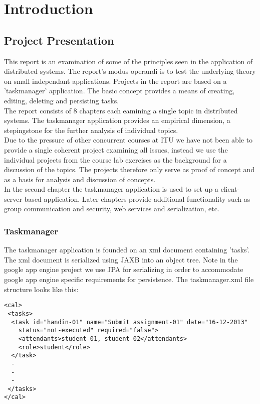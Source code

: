 \chapter{Introduction}
\minitoc

\section{Project Presentation}

This report is an examination of some of the principles seen in the application of distributed systems. The report's modus operandi is to test the underlying theory on small independant applications. Projects in the report are based on a 'taskmanager' application. The basic concept provides a means of creating, editing, deleting and persisting tasks. \\

The report consists of 8 chapters each eamining a single topic in distributed systems. The taskmanager application provides an empirical dimension, a stepingstone for the further analysis of individual topics. \\

Due to the pressure of other concurrent courses at ITU we have not been able to provide a single coherent project examining all issues, instead we use the individual projects from the course lab exercises as the background for a discussion of the topics. The projects therefore only serve as proof of concept and as a basis for analysis and discussion of concepts.  \\

In the second chapter the taskmanager application is used to set up a client-server based application. Later chapters provide additional functionality such as group communication and security, web services and serialization, etc. \\

\begin{comment}
The idea is to try out some of the techniques commonly seen in the implementation of distributed systems and thereby demonstrate our understanding of the theories behind, as well as (some of), the challenges faced by distributed systems. 
\end{comment}

\subsection{Taskmanager}

The taskmanager application is founded on an xml document containing 'tasks'. The xml document is serialized using JAXB into an object tree. Note in the google app engine project we use JPA for serializing in order to accommodate google app engine specific requirements for persistence. The taskmanager.xml file structure looks like this:
\pagebreak
\begin{lstlisting}[caption = taskmanager.xml]
<cal>
 <tasks>
  <task id="handin-01" name="Submit assignment-01" date="16-12-2013"
	status="not-executed" required="false">
	<attendants>student-01, student-02</attendants>
	<role>student</role>	
  </task>
  - 
  - 
  - 
 </tasks>
</cal>
\end{lstlisting}

